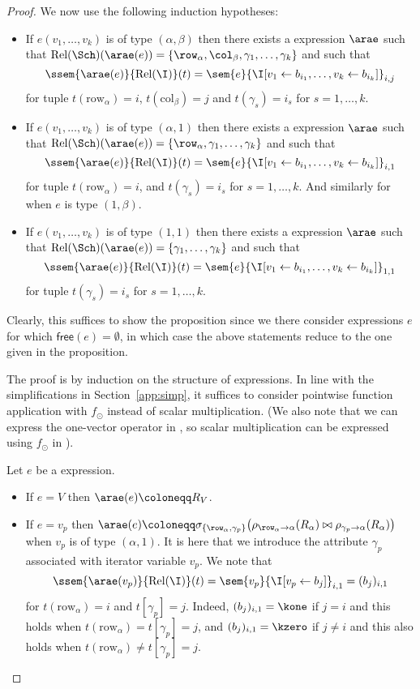 \begin{proof}
We now use the following induction hypotheses:
\begin{itemize}
	\item If $e(v_1,\ldots,v_k)$ is of type $(\alpha,\beta)$ then there exists a
	\rak expression $\arae$ such that $\text{Rel}(\Sch)(\arae(e))=\{\row_\alpha,\col_\beta,\gamma_1,\ldots,\gamma_k\}$
	and such that 
	$$
	\ssem{\arae(e)}{\text{Rel}(\I)}(t)=\sem{e}{\I[v_1\gets b_{i_1},\ldots,v_k\gets b_{i_k}]}_{i,j}
	$$
	for tuple $t(\mathrm{row}_\alpha)=i$, $t(\mathrm{col}_\beta)=j$ and $t(\gamma_s)=i_s$ for $s=1,\ldots, k$.
	\item If $e(v_1,\ldots,v_k)$ is of type $(\alpha,1)$ then there exists a
	\rak expression $\arae$ such that $\text{Rel}(\Sch)(\arae(e))=\{\row_\alpha,\gamma_1,\ldots,\gamma_k\}$
	and such that 
	$$
	\ssem{\arae(e)}{\text{Rel}(\I)}(t)=\sem{e}{\I[v_1\gets b_{i_1},\ldots,v_k\gets b_{i_k}]}_{i,1}
	$$
	for tuple $t(\mathrm{row}_\alpha)=i$,  and $t(\gamma_s)=i_s$ for $s=1,\ldots, k$.
	And similarly for when $e$ is type $(1,\beta)$.
	\item If $e(v_1,\ldots,v_k)$ is of type $(1,1)$ then there exists a
	\rak expression $\arae$ such that $\text{Rel}(\Sch)(\arae(e))=\{\gamma_1,\ldots,\gamma_k\}$
	and such that 
	$$
	\ssem{\arae(e)}{\text{Rel}(\I)}(t)=\sem{e}{\I[v_1\gets b_{i_1},\ldots,v_k\gets b_{i_k}]}_{1,1}
	$$
	for tuple $t(\gamma_s)=i_s$ for $s=1,\ldots, k$.
\end{itemize}
Clearly, this suffices to show the proposition since we there consider expressions $e$ for which $\mathsf{free}(e)=\emptyset$, in which case the above statements reduce to the one given in the proposition.


The proof is by induction on the structure of \langsum expressions. In line with the simplifications in Section~\ref{app:simp}, it suffices to consider pointwise function application with $f_\odot$ instead of scalar multiplication. (We also note that we can express the one-vector operator in \langsum, so scalar multiplication can be expressed using $f_\odot$ in \langsum).

Let $e$ be a \langsum expression.
\begin{itemize}
  \item If $e=V$ then $\arae (e)\coloneqq R_V$.
  \item If $e=v_p$ then $\arae (e)\coloneqq \sigma_{\lbrace \row_\alpha,\gamma_p\rbrace}\bigl(\rho_{\row_\alpha\to \alpha}(R_\alpha)\bowtie \rho_{\gamma_p\to \alpha}(R_\alpha)\bigr)$ when  $v_p$ is of type $(\alpha,1)$. It is here that we introduce the attribute $\gamma_p$ associated with iterator variable $v_p$.
 We note that 
$$ \ssem{\arae(v_p)}{\text{Rel}(\I)}(t)=\sem{v_p}{\I[v_p\gets b_{j}]}_{i,1}=(b_j)_{i,1}
$$
for $t(\mathrm{row}_\alpha)=i$ and $t[\gamma_p]=j$. Indeed, $(b_j)_{i,1}=\kone$ if $j=i$
and this holds when $t(\mathrm{row}_\alpha)=t[\gamma_p]=j$, and $(b_j)_{i,1}=\kzero$ if $j\neq i$
and this also holds when $t(\mathrm{row}_\alpha)\neq t[\gamma_p]=j$.


\end{itemize}
\end{proof}
